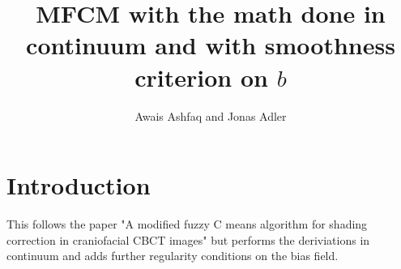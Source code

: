 \documentclass{llncs}
\begin{document}
%
\mainmatter              %
%
\title{MFCM with the math done in continuum and with smoothness criterion on $b$}
%
%
\author{Awais Ashfaq and Jonas Adler }
%
%
%

\maketitle              %

\section{Introduction}

This follows the paper "A modified fuzzy C means algorithm for shading correction in craniofacial CBCT images" but performs the deriviations in continuum and adds further regularity conditions on the bias field.
\end{document}
